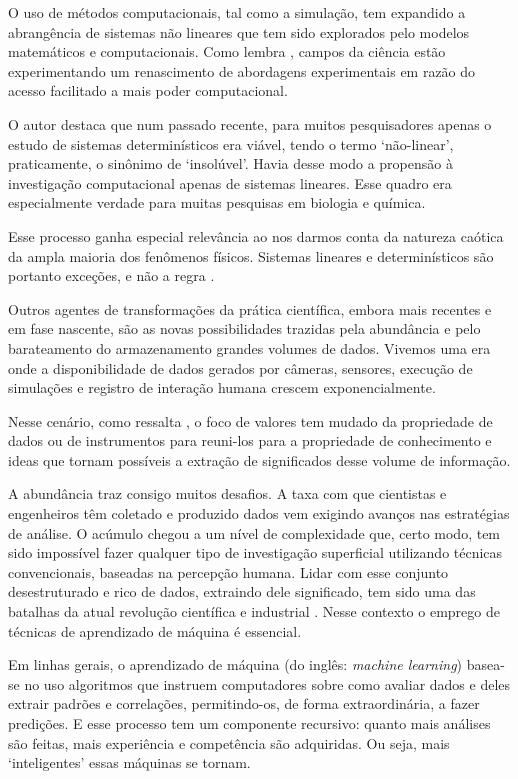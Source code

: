 O uso de métodos computacionais, tal como a simulação, tem expandido a abrangência de sistemas não lineares que tem sido explorados pelo modelos matemáticos e computacionais. Como lembra , campos da ciência estão experimentando um renascimento de abordagens experimentais em razão do acesso facilitado a mais poder computacional. 

O autor destaca que num passado recente, para muitos pesquisadores apenas o estudo de sistemas determinísticos era viável, tendo o termo `não-linear', praticamente, o sinônimo de `insolúvel'. Havia desse modo a propensão à investigação computacional apenas de sistemas lineares. Esse quadro era especialmente verdade para muitas pesquisas em biologia e química. 

Esse processo ganha especial relevância ao nos darmos conta da natureza caótica da ampla maioria dos fenômenos físicos. Sistemas lineares e determinísticos são portanto exceções, e não a regra \cite[]{Weintrop2016}.

Outros agentes de transformações da prática científica, embora mais recentes e em fase nascente, são as novas possibilidades trazidas pela abundância e pelo barateamento do armazenamento grandes volumes de dados. Vivemos uma era onde a disponibilidade de dados gerados por câmeras, sensores, execução de simulações e registro de interação humana crescem exponencialmente. 

Nesse cenário, como ressalta , o foco de valores tem mudado da propriedade de dados ou de instrumentos para reuni-los para a propriedade de conhecimento e ideas que tornam possíveis a extração de significados desse volume de informação. 

A abundância traz consigo muitos desafios. A taxa com que cientistas e engenheiros têm coletado e produzido dados vem exigindo avanços nas estratégias de análise. O acúmulo chegou a um nível de complexidade que, certo modo, tem sido impossível fazer qualquer tipo de investigação superficial utilizando técnicas convencionais, baseadas na percepção humana. Lidar com esse conjunto desestruturado e rico de dados, extraindo dele significado, tem sido uma das batalhas da atual revolução científica e industrial \cite[]{Djorgovski2005}. Nesse contexto o emprego de técnicas de aprendizado de máquina é essencial.

Em linhas gerais, o aprendizado de máquina (do inglês: \textit{machine learning}) basea-se no uso algoritmos que instruem computadores sobre como avaliar dados e deles extrair padrões e correlações, permitindo-os, de forma extraordinária, a fazer predições. E esse processo tem um componente recursivo: quanto mais análises são feitas, mais experiência e competência são adquiridas. Ou seja, mais `inteligentes' essas máquinas se tornam.

